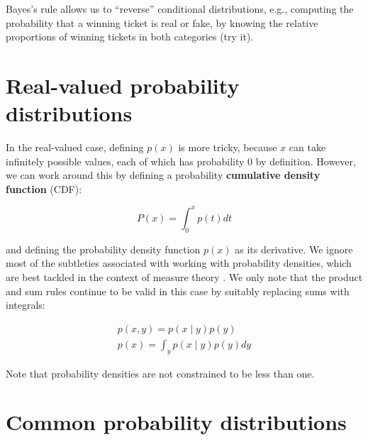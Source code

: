 Bayes’s rule allows us to “reverse” conditional distributions, e.g., computing the probability that a winning ticket is real or fake, by knowing the relative proportions of winning tickets in both categories (try it).

\section{Real-valued probability distributions}

In the real-valued case, defining $p(x)$ is more tricky, because $x$ can take infinitely possible values, each of which has probability $0$ by definition. However, we can work around this by defining a probability \textbf{cumulative density function} (CDF):

$$
P(x)=\int_{0}^xp(t)dt
$$

and defining the probability density function $p(x)$ as its derivative. We ignore most of the subtleties associated with working with probability densities, which are best tackled in the context of measure theory \cite{bogachev2007measure}. We only note that the product and sum rules continue to be valid in this case by suitably replacing sums with integrals:

\begin{gather}
p(x,y)=p(x\mid y)p(y) \\ 
p(x)=\int_y p(x \mid y)p(y)dy
\end{gather}

Note that probability densities are not constrained to be less than one.

\section{Common probability distributions}

